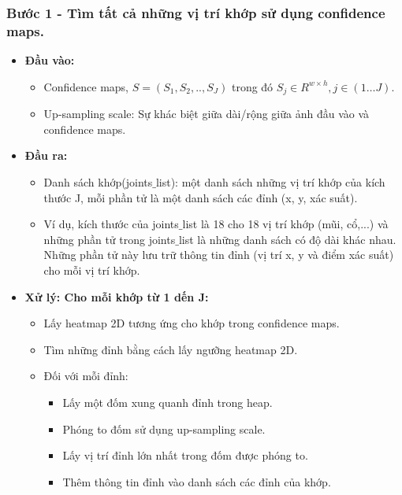 \subsubsection{Bước 1 - Tìm tất cả những vị trí khớp sử dụng confidence maps.}
\begin{itemize}
\item \textbf{Đầu vào:}
	\begin{itemize}
	\item Confidence maps, $S = (S_1, S_2, .., S_J)$ trong đó $S_j \in R^{w \times h},j \in (1 \ldots J)$.
	\item Up-sampling scale: Sự khác biệt giữa dài/rộng giữa ảnh đầu vào và confidence maps.
	\end{itemize}
\item \textbf{Đầu ra: }
	\begin{itemize}
	\item Danh sách khớp(joints$\_$list): một danh sách những vị trí khớp của kích thước J, mỗi phần tử là một danh sách các đỉnh (x, y, xác suất).
	\item Ví dụ, kích thước của joints$\_$list là 18 cho 18 vị trí khớp (mũi, cổ,...) và những phần tử trong joints$\_$list là những danh sách có độ dài khác nhau. Những phần tử này lưu trữ thông tin đỉnh (vị trí x, y và điểm xác suất) cho mỗi vị trí khớp.
	\end{itemize}
\item \textbf{Xử lý: Cho mỗi khớp từ 1 dến J:}
	\begin{itemize}
	\item Lấy heatmap 2D tương ứng cho khớp trong confidence maps.
	\item Tìm những đỉnh bằng cách lấy ngưỡng heatmap 2D.
	\item Đối với mỗi đỉnh:
		\begin{itemize}
		\item Lấy một đốm xung quanh đỉnh trong heap.
		\item Phóng to đốm sử dụng up-sampling scale.
		\item Lấy vị trí đỉnh lớn nhất trong đốm được phóng to.
		\item Thêm thông tin đỉnh vào danh sách các đỉnh của khớp.
		\end{itemize}
	\end{itemize}
\end{itemize}

